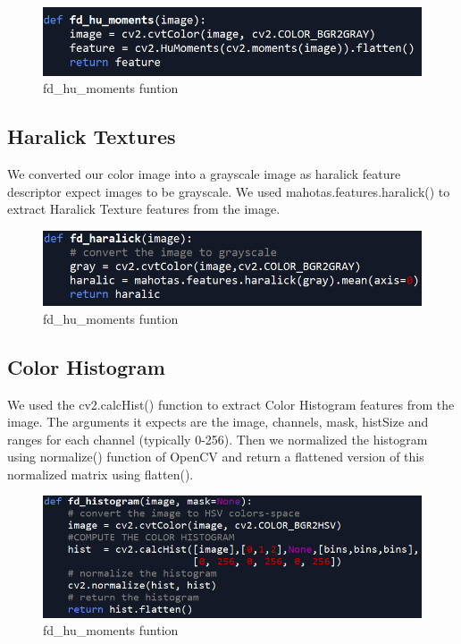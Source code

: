 \documentclass[onecolumn]{article}
\begin{document}
\begin{figure}[H]
\centering
  \includegraphics[scale=0.7]{images/fd_hu_moments.PNG}
  \caption{fd\_hu\_moments funtion}
  \label{fig:6}
\end{figure}


 
\subsection{Haralick Textures}
We converted our color image into a grayscale image as haralick feature descriptor expect images to be grayscale. We used mahotas.features.haralick() to extract Haralick Texture features from the image.


\begin{figure}[H]
\centering
  \includegraphics[scale=0.7]{images/fd_haralick.PNG}
  \caption{fd\_hu\_moments funtion}
  \label{fig:6}
\end{figure}


\subsection{Color Histogram}
We used the cv2.calcHist() function to extract Color Histogram features from the image. The arguments it expects are the image, channels, mask, histSize  and ranges for each channel (typically 0-256). Then we normalized the histogram using normalize() function of OpenCV and return a flattened version of this normalized matrix using flatten().


\begin{figure}[H]
\centering
  \includegraphics[scale=0.7]{images/fd_histogram.PNG}
  \caption{fd\_hu\_moments funtion}
  \label{fig:6}
\end{figure}
\end{document}
